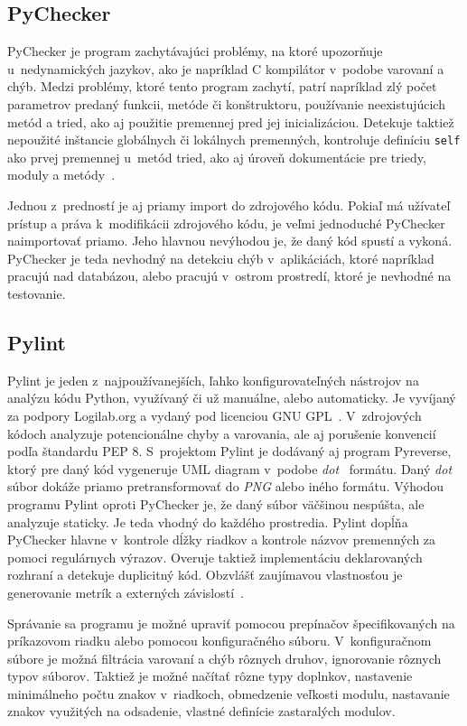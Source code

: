 \documentclass[11pt,oneside,final]{fithesis2}
\begin{document}
\subsection{PyChecker}

	PyChecker je program zachytávajúci problémy, na ktoré upozorňuje u~nedynamických jazykov, ako je napríklad C kompilátor v~podobe varovaní a chýb. Medzi problémy, ktoré tento program zachytí, patrí napríklad zlý počet parametrov predaný funkcii, metóde či konštruktoru, používanie neexistujúcich metód a tried, ako aj použitie premennej pred jej inicializáciou. Detekuje taktiež nepoužité inštancie globálnych či lokálnych premenných, kontroluje definíciu \texttt{self} ako prvej premennej u~metód tried, ako aj úroveň dokumentácie pre triedy, moduly a metódy~\cite{pychecker}. 
	
	Jednou z~predností je aj priamy import do zdrojového kódu. Pokiaľ má užívateľ prístup a práva k~modifikácii zdrojového kódu, je veľmi jednoduché PyChecker naimportovať priamo. Jeho hlavnou nevýhodou je, že daný kód spustí a vykoná. PyChecker je teda nevhodný na detekciu chýb v~aplikáciách, ktoré napríklad pracujú nad databázou, alebo pracujú v~ostrom prostredí, ktoré je nevhodné na testovanie.

\subsection{Pylint}
	Pylint je jeden z~najpoužívanejších, ľahko konfigurovateľných nástrojov na analýzu kódu Python, využívaný či už manuálne, alebo automaticky. Je vyvíjaný za podpory Logilab.org a vydaný pod licenciou GNU GPL~\cite{gnugpl}. V~zdrojových kódoch analyzuje potencionálne chyby a varovania, ale aj porušenie konvencií podľa štandardu PEP 8. S~projektom Pylint je dodávaný aj program Pyreverse, ktorý pre daný kód vygeneruje UML diagram v~podobe \textit{dot}~\cite{dotformat} formátu. Daný \textit{dot} súbor dokáže priamo pretransformovať do \textit{PNG} alebo iného formátu. Výhodou programu Pylint oproti PyChecker je, že daný súbor väčšinou nespúšta, ale analyzuje staticky. Je teda vhodný do každého prostredia. Pylint dopĺňa PyChecker hlavne v~kontrole dĺžky riadkov a kontrole názvov premenných za pomoci regulárnych výrazov. Overuje taktiež implementáciu deklarovaných rozhraní a detekuje duplicitný kód.
    Obzvlášť zaujímavou vlastnosťou je generovanie metrík a externých závislostí~\cite{pylint}.

	Správanie sa programu je možné upraviť pomocou prepínačov špecifikovaných na príkazovom riadku alebo pomocou konfiguračného súboru. V~konfiguračnom súbore je možná filtrácia varovaní a chýb rôznych druhov, ignorovanie rôznych typov súborov. Taktiež je možné načítať rôzne typy doplnkov, nastavenie minimálneho počtu znakov v~riadkoch, obmedzenie veľkosti modulu, nastavanie znakov využitých na odsadenie, vlastné definície zastaralých modulov.
    
\end{document}
